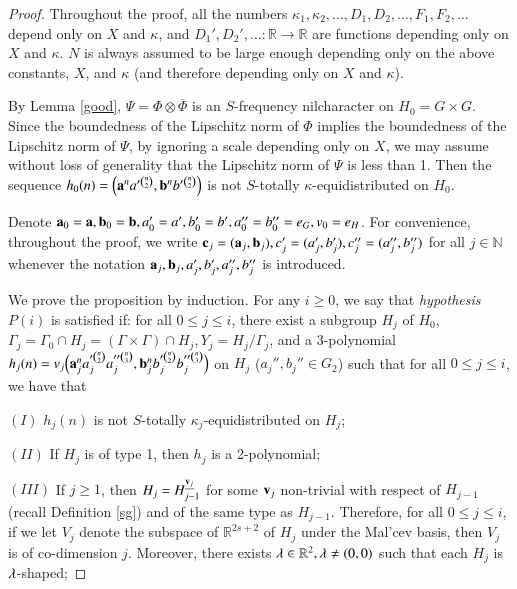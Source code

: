 \documentclass[12pt,amstex]{amsart}
\theoremstyle{definition}
\def \D {\kappa}
\def \c {\bold{c}}
\def \a {\bold{a}}
\def \b {\bold{b}}
\def \v {\bold{v}}
\def \l {\bold{\lambda}}
\begin{document}
\begin{proof}
Throughout the proof, all the numbers $\D_{1},\D_{2},\dots,D_{1},D_{2},\dots,F_{1},F_{2},\dots$ depend only on $X$ and $\D$, and $D_{1}',D_{2}',\dots\colon
\mathbb{R}\rightarrow\mathbb{R}$ are functions depending only on $X$ and $\D$. $N$ is always assumed to be large enough depending only on the above constants, $X$, 
and $\D$ (and therefore depending only on $X$ and $\D$).  

By Lemma \ref{good}, $\Psi=\Phi\otimes\overline{\Phi}$ is an $S$-frequency nilcharacter on $H_{0}=G\times G$. Since the boundedness of the Lipschitz norm
of $\Phi$ implies the boundedness of the Lipschitz norm of $\Psi$, by ignoring a scale depending only on $X$, we may assume without loss of generality that the Lipschitz norm of $\Psi$ is less than 1.
 Then the sequence $h_{0}(n)=\Bigl(\a^{n}a'^{\binom{n}{2}},\b^{n}b'^{\binom{n}{2}}\Bigr)$ is not $S$-totally $\D$-equidistributed on $H_{0}$.


Denote $\a_{0}=\a, \b_{0}=\b, a'_{0}=a', b'_{0}=b',a_{0}''=b_{0}''=e_{G},v_{0}=e_{H}$.
For convenience, throughout the proof, we write $\c_{j}=(\a_{j},\b_{j}), c'_{j}=(a'_{j},b'_{j}),c''_{j}=(a''_{j},b''_{j})$ for all $j\in\mathbb{N}$ whenever the notation $\a_{j},\b_{j},a'_{j},b'_{j},a''_{j},b''_{j}$ is introduced.

We prove the proposition by induction. For any $i\geq 0$, we say that \emph{hypothesis $P(i)$} is satisfied if:
 for all $0\leq j\leq i$, there exist a subgroup $H_{j}$ of $H_{0}$, $\Gamma_{j}=\Gamma_{0}\cap H_{j}=(\Gamma\times\Gamma)\cap H_{j}, Y_{j}=H_{j}/\Gamma_{j}$, and a 3-polynomial
$h_{j}(n)=v_{j}\Bigl(\a_{j}^{n}a_{j}'^{\binom{n}{2}}a_{j}''^{\binom{n}{3}},\b_{j}^{n}b_{j}'^{\binom{n}{2}}b_{j}''^{\binom{n}{3}}\Bigr)$ on $H_{j}$ ($a_{j}'',b_{j}''\in G_{2}$)
such that for all $0\leq j\leq i$, we have that

$(I)$ $h_{j}(n)$ is not $S$-totally $\D_{j}$-equidistributed on $H_{j}$;

$(II)$ If $H_{j}$ is of type 1, then $h_{j}$ is a 2-polynomial;

$(III)$ If $j\geq 1$, then $H_{j}=H_{j-1}^{\underline{\v_{j}}}$ for some $\v_{j}$ non-trivial with respect of $H_{j-1}$ (recall Definition \ref{sg}) and of the same type as $H_{j-1}$. Therefore, for all $0\leq j\leq i$, if we let $V_{j}$ denote the subspace of $\mathbb{R}^{2s+2}$ of $H_{j}$ under the Mal'cev basis, then $V_{j}$ is of co-dimension $j$. Moreover, there exists $\l\in\mathbb{R}^{2}, \l\neq (0,0)$ such that each $H_{j}$ is $\l$-shaped;


\end{proof}
\end{document}
